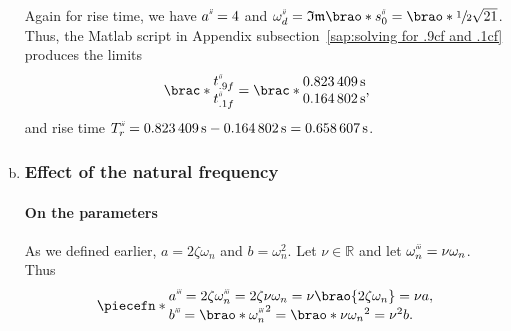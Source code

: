 \documentclass[12pt]{article}
\DeclarePairedDelimiter\brao()%
\DeclarePairedDelimiter\brac[]%
\DeclarePairedDelimiter\piecefn\{.
\newcommand{\setprime}[2][1]{%
    {#2}^{%
        \raisebox{1pt}{%
            \scalebox{0.5}{%
                \itshape\sffamily\uppercase%
                \expandafter{%
                    \romannumeral#1%
                }%
            }%
        }
    }%
}%
\begin{document}
\begin{enumerate}[(a)]
        Again for rise time, we have $\setprime[2]a = 4$ and $\setprime[2]\omega_d = \mathfrak{Im}\brao*{\setprime[2]s_0} = \brao*{\sfrac12}\sqrt{21}$.
        Thus, the Matlab script in Appendix subsection~\ref{sap:solving for .9cf and .1cf} produces the limits
        \begin{equation}
            \brac*{
                \begin{matrix}
                    \setprime[2]t_{.9f} \\*
                    \setprime[2]t_{.1f} \\*
                \end{matrix}
            }
            =
            \brac*{
                \begin{matrix}
                    \SI{0.823409}\second \\*
                    \SI{0.164802}\second \\*
                \end{matrix}
            }\rlap,
        \end{equation}
        and rise time $\setprime[2]T_r = \SI{0.823409}\second - \SI{0.164802}\second = \SI{0.658607}\second$.

    \item
        \subsubsection{Effect of the natural frequency}

        \paragraph{On the parameters}
        As we defined earlier, $a = 2\zeta\omega_n$ and $b = \omega_n^2$.
        Let $\nu \in \mathbb{R}$ and let $\setprime[3]\omega_n = \nu\omega_n$.
        Thus
        \begin{equation}
            \piecefn*{
                \begin{array}{@{}l@{}}
                    \setprime[3]a = 2\zeta\setprime[3]\omega_n = 2\zeta\nu\omega_n = \nu\brao{2\zeta\omega_n} = \nu a,
                \\*
                    \setprime[3]b = \brao*{\setprime[3]\omega_n}^2 = \brao*{\nu\omega_n}^2 = \nu^2 b.
                \\*
                \end{array}
            }
        \end{equation}


\end{enumerate}
\end{document}
